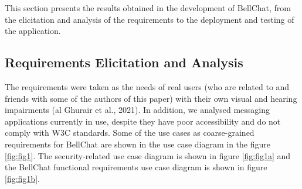 \documentclass{svproc}
\begin{document}
This section presents the results obtained in the development of BellChat, from the elicitation and analysis of the requirements to the deployment and testing of the application.

\subsection{Requirements Elicitation and Analysis}

The requirements were taken as the needs of real users (who are related to and friends with some of the authors of this paper) with their own visual and hearing impairments (al Ghurair et al., 2021). In addition, we analysed messaging applications currently in use, despite they have poor accessibility and do not comply with W3C standards. Some of the use cases as coarse-grained requirements for BellChat are shown in the use case diagram in the figure \ref{fig:fig1}. The security-related use case diagram is shown in figure \ref{fig:fig1a} and the BellChat functional requirements use case diagram is shown in figure \ref{fig:fig1b}.
\end{document}
